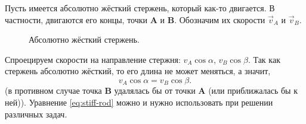 

\renewcommand{\libproblempath}{../../../materials/problems_db}



\setcounter{notask}{4}


\vspace{0.25cm}


\vspace{0.25cm}


\flushleft

Пусть имеется абсолютно жёсткий стержень, который как-то двигается. В
частности, двигаются его концы, точки \textbf{A} и
\textbf{B}. Обозначим их скорости $\vec{v}_A$ и $\vec{v}_B$. 

\begin{figure}[h]
  \centering
  \caption{Абсолютно жёсткий стержень. }
  \label{fig:rod}
\end{figure}

Спроецируем скорости на направление стержня: $v_A \cos \alpha$, $v_B
\cos \beta$. Так как стержень абсолютно жёсткий, то его длина не может
меняться, а значит,
\begin{equation}
  \label{eq:stiff-rod}
  v_A \cos \alpha = v_B \cos \beta. 
\end{equation}
(в противном случае точка \textbf{B} удалялась бы от точки \textbf{A}
(или приближалась бы к ней)). Уравнение \eqref{eq:stiff-rod} можно и
нужно использовать при решении различных задач.

\vspace{0.5cm}




